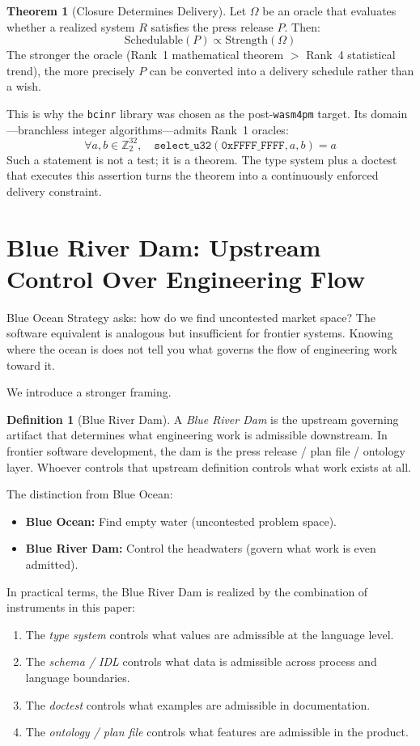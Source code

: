 \documentclass[11pt,a4paper]{article}
\theoremstyle{definition}
\newtheorem{theorem}{Theorem}
\newtheorem{definition}{Definition}
\begin{document}
\begin{theorem}[Closure Determines Delivery]
Let $\Omega$ be an oracle that evaluates whether a realized system $R$ satisfies the press release $P$. Then:
$$\text{Schedulable}(P) \propto \text{Strength}(\Omega)$$
The stronger the oracle (Rank~1 mathematical theorem $>$ Rank~4 statistical trend), the more precisely $P$ can be converted into a delivery schedule rather than a wish.
\end{theorem}

This is why the \texttt{bcinr} library was chosen as the post-\texttt{wasm4pm} target. Its domain---branchless integer algorithms---admits Rank~1 oracles:
$$\forall a, b \in \mathbb{Z}_2^{32},\quad \texttt{select\_u32}(\texttt{0xFFFF\_FFFF}, a, b) = a$$
Such a statement is not a test; it is a theorem. The type system plus a doctest that executes this assertion turns the theorem into a continuously enforced delivery constraint.

\section{Blue River Dam: Upstream Control Over Engineering Flow}

Blue Ocean Strategy asks: how do we find uncontested market space? The software equivalent is analogous but insufficient for frontier systems. Knowing where the ocean is does not tell you what governs the flow of engineering work toward it.

We introduce a stronger framing.

\begin{definition}[Blue River Dam]
A \emph{Blue River Dam} is the upstream governing artifact that determines what engineering work is admissible downstream. In frontier software development, the dam is the press release / plan file / ontology layer. Whoever controls that upstream definition controls what work exists at all.
\end{definition}

The distinction from Blue Ocean:
\begin{itemize}
\item \textbf{Blue Ocean:} Find empty water (uncontested problem space).
\item \textbf{Blue River Dam:} Control the headwaters (govern what work is even admitted).
\end{itemize}

In practical terms, the Blue River Dam is realized by the combination of instruments in this paper:
\begin{enumerate}
\item The \emph{type system} controls what values are admissible at the language level.
\item The \emph{schema / IDL} controls what data is admissible across process and language boundaries.
\item The \emph{doctest} controls what examples are admissible in documentation.
\item The \emph{ontology / plan file} controls what features are admissible in the product.
\end{enumerate}
\end{document}
